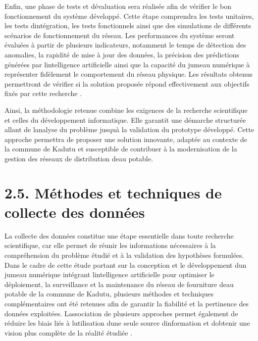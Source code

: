 \documentclass[12pt,a4paper,oneside]{report}
\begin{document}
Enfin, une phase de tests et d\textquotesingle évaluation sera réalisée
afin de vérifier le bon fonctionnement du système développé. Cette étape
comprendra les tests unitaires, les tests d\textquotesingle intégration,
les tests fonctionnels ainsi que des simulations de différents scénarios
de fonctionnement du réseau. Les performances du système seront évaluées
à partir de plusieurs indicateurs, notamment le temps de détection des
anomalies, la rapidité de mise à jour des données, la précision des
prédictions générées par l\textquotesingle intelligence artificielle
ainsi que la capacité du jumeau numérique à représenter fidèlement le
comportement du réseau physique. Les résultats obtenus permettront de
vérifier si la solution proposée répond effectivement aux objectifs
fixés par cette recherche \cite{ref107}.

Ainsi, la méthodologie retenue combine les exigences de la recherche
scientifique et celles du développement informatique. Elle garantit une
démarche structurée allant de l\textquotesingle analyse du problème
jusqu\textquotesingle à la validation du prototype développé. Cette
approche permettra de proposer une solution innovante, adaptée au
contexte de la commune de Kadutu et susceptible de contribuer à la
modernisation de la gestion des réseaux de distribution
d\textquotesingle eau potable.

\section{\texorpdfstring{\textbf{2.5. Méthodes et techniques de collecte
des
données}}{2.5. Méthodes et techniques de collecte des données}}\label{muxe9thodes-et-techniques-de-collecte-des-donnuxe9es}

La collecte des données constitue une étape essentielle dans toute
recherche scientifique, car elle permet de réunir les informations
nécessaires à la compréhension du problème étudié et à la validation des
hypothèses formulées. Dans le cadre de cette étude portant sur la
conception et le développement d\textquotesingle un jumeau numérique
intégrant l\textquotesingle intelligence artificielle pour optimiser le
déploiement, la surveillance et la maintenance du réseau de fourniture
d\textquotesingle eau potable de la commune de Kadutu, plusieurs
méthodes et techniques complémentaires ont été retenues afin de garantir
la fiabilité et la pertinence des données exploitées.
L\textquotesingle association de plusieurs approches permet également de
réduire les biais liés à l\textquotesingle utilisation
d\textquotesingle une seule source d\textquotesingle information et
d\textquotesingle obtenir une vision plus complète de la réalité étudiée
\cite{ref75}.
\end{document}
